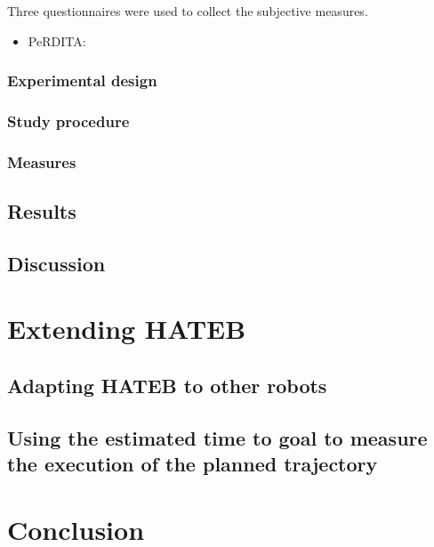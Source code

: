 \documentclass[a4paper,11pt,twoside]{StyleThese}
\begin{document}
Three questionnaires were used to collect the subjective measures.
\begin{itemize}
\item PeRDITA: 
\end{itemize}	

\subsubsection{Experimental design}

\subsubsection{Study procedure}

\subsubsection{Measures}

\subsection{Results}

\subsection{Discussion}

\section{Extending HATEB}
\subsection{Adapting HATEB to other robots}

\subsection{Using the estimated time to goal to measure the execution of the planned trajectory}

\section{Conclusion}

\ifdefined{}
\else


\end{document}
